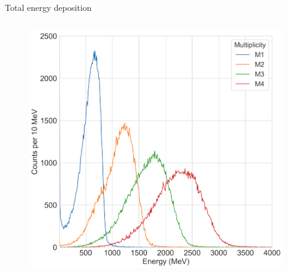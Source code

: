 \documentclass[compress, 13pt, aspectratio=169]{beamer}
\begin{document}
\begin{frame}{Total energy deposition}
\begin{columns}
\begin{column}{0.5\textwidth}
            \begin{figure}[t]
                \includegraphics[keepaspectratio, width = \textwidth]{Plots/ETot_E1}%
            \end{figure}
        \end{column}
    \end{columns}
\end{frame}
\end{document}
